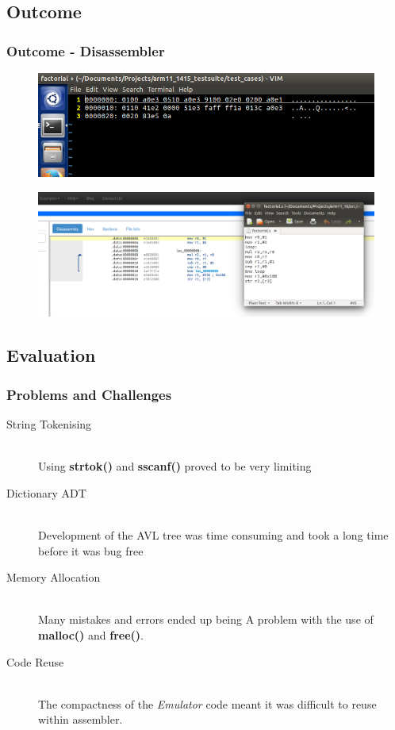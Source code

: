 \documentclass{beamer}
\begin{document}
\subsection{Outcome}
\begin{frame}[fragile] %
\frametitle{Outcome - Disassembler}

\begin{figure}
\includegraphics[width=1\linewidth]{Images/Screen1.png}
\end{figure}

\begin{figure}
\includegraphics[width=1\linewidth]{Images/Screen2.png}
\end{figure}

\end{frame}

\subsection{Evaluation}
\begin{frame}
\frametitle{Problems and Challenges}
\begin{description}
\item[String Tokenising]\hfill\\
	Using \textbf{strtok()} and \textbf{sscanf()} proved to be very limiting
	
\item[Dictionary ADT]\hfill\\
	Development of the AVL tree was time consuming and took a long time before it was bug free
	
\item[Memory Allocation]\hfill\\
	Many mistakes and errors ended up being A problem with the use of \textbf{malloc()} and \textbf{free()}.

\item[Code Reuse]\hfill\\
	The compactness of the \textit{Emulator} code meant it was difficult to reuse within assembler. 


\end{description}
\end{frame}
\end{document}
